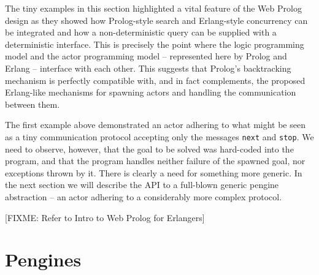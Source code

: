 \documentclass{tlp}
\begin{document}
%
%

The tiny examples in this section highlighted a vital feature of the Web Prolog design as they showed how Prolog-style search and Erlang-style concurrency can be integrated and how a non-deterministic query can be supplied with a deterministic interface. This is precisely the point where the logic programming model and the actor programming model -- represented here by Prolog and Erlang -- interface with each other. This suggests that Prolog's backtracking mechanism is perfectly compatible with, and in fact complements, the proposed Erlang-like mechanisms for spawning actors and handling the communication between them.

The first example above demonstrated an actor adhering to what might be seen as a tiny communication protocol accepting only the messages \texttt{next} and \texttt{stop}. We need to observe, however, that the goal to be solved was hard-coded into the program, and that the program handles neither failure of the spawned goal, nor exceptions thrown by it. There is clearly a need for something more generic. In the next section we will describe the API to a full-blown generic pengine abstraction -- an actor adhering to a considerably more complex protocol.

[FIXME: Refer to Intro to Web Prolog for Erlangers]

\section{Pengines}\label{sec:pengines}
\end{document}

